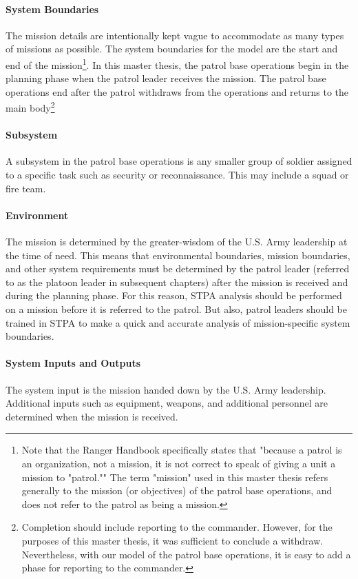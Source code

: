 \documentclass[../../main/main.tex]{subfiles}
\begin{document}
\paragraph*{System Boundaries}
The mission details are intentionally kept vague to accommodate as many types of missions as possible.  The system boundaries for the model are the start and end of the mission\footnote{Note that the Ranger Handbook specifically states that "because a patrol is an organization, not a mission, it is not correct to speak of giving a unit a mission to "patrol.""  The term "mission" used in this master thesis refers generally to the mission (or objectives) of the patrol base operations, and does not refer to the patrol as being a mission.}. In this master thesis, the patrol base operations begin in the planning phase when the patrol leader receives the mission.  The patrol base operations end after the patrol withdraws from the operations and returns to the main body\footnote{Completion should include reporting to the commander.  However, for the purposes of this master thesis, it was sufficient to conclude a withdraw.  Nevertheless, with our model of the patrol base operations, it is easy to add a phase for reporting to the commander.}

\paragraph*{Subsystem}
A subsystem in the patrol base operations is any smaller group of soldier assigned to a specific task such as security or reconnaissance.  This may include a squad or fire team.  

\paragraph*{Environment}
The mission is determined by the greater-wisdom of the U.S. Army leadership at the time of need.  This means that environmental boundaries, mission boundaries, and other system requirements must be determined by the patrol leader  (referred to as the platoon leader in subsequent chapters) after the mission is received and during the planning phase.  For this reason, STPA analysis should be performed on a mission before it is referred to the patrol.  But also, patrol leaders should be trained in STPA to make a quick and accurate analysis of mission-specific system boundaries.  


\paragraph*{System Inputs and Outputs}
The system input is the mission handed down by the U.S. Army leadership.  Additional inputs such as equipment, weapons, and additional personnel are determined when the mission is received. 
\end{document}
